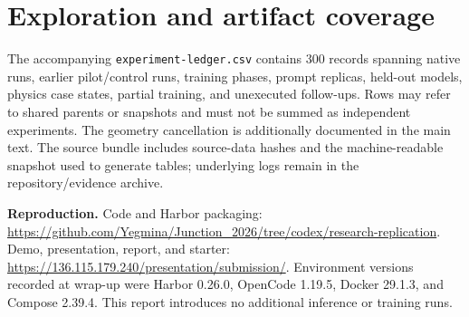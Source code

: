 \documentclass[10pt,a4paper,twocolumn]{article}
\begin{document}
\appendix
\section{Exploration and artifact coverage}\label{sec:early}
\begin{table}[ht]\centering\scriptsize\resizebox{\columnwidth}{!}{}\caption{Earlier exploratory development arms. Results share parents and are not independent replications; configurations and stopping rules changed.}\end{table}

The accompanying \texttt{experiment-ledger.csv} contains 300 records spanning native runs, earlier pilot/control runs, training phases, prompt replicas, held-out models, physics case states, partial training, and unexecuted follow-ups. Rows may refer to shared parents or snapshots and must not be summed as independent experiments. The geometry cancellation is additionally documented in the main text. The source bundle includes source-data hashes and the machine-readable snapshot used to generate tables; underlying logs remain in the repository/evidence archive.

\noindent\textbf{Reproduction.} Code and Harbor packaging: \url{https://github.com/Yegmina/Junction_2026/tree/codex/research-replication}. Demo, presentation, report, and starter: \url{https://136.115.179.240/presentation/submission/}. Environment versions recorded at wrap-up were Harbor 0.26.0, OpenCode 1.19.5, Docker 29.1.3, and Compose 2.39.4. This report introduces no additional inference or training runs.
\end{document}
